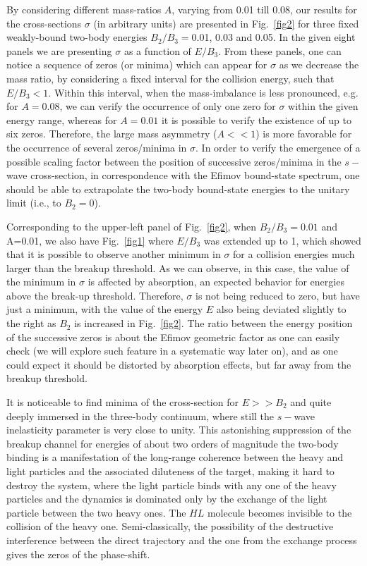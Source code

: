 \documentclass[twocolumn,amsmath,amssymb,epsfig,aps,prl]{revtex4}
\begin{document}
By considering different mass-ratios $A$, varying from 0.01 till 0.08, our
results for the cross-sections $\sigma$ (in arbitrary units)  are presented in Fig.~\ref{fig2} for 
three fixed weakly-bound two-body energies $B_2/{ B}_3=$0.01, 0.03 and 0.05. In the given  
eight panels we are presenting $\sigma$ as a function of $E/{ B}_3$.
From these panels, one can notice a sequence of zeros (or minima) which can appear for $\sigma$ 
as we decrease the mass ratio, by considering a fixed interval for the collision energy, such that
$E/{B}_3<1$.
Within this interval, when the mass-imbalance is less pronounced, e.g. for $A=0.08$, we can verify the 
occurrence of only one zero for $\sigma$ within the given energy range, whereas for  
$A=0.01$ it is possible to verify the existence of up to six zeros. 
Therefore, the large mass asymmetry ($A<<1$) is more favorable 
for the occurrence of several zeros/minima in $\sigma$. In order to verify the emergence
of a possible scaling factor between the position of successive zeros/minima in the $s-$wave cross-section, 
in correspondence with the Efimov bound-state spectrum, one should be able to extrapolate the 
two-body bound-state energies to the unitary limit (i.e., to $B_2=0$). 

Corresponding to the upper-left panel of Fig.~\ref{fig2}, when  $B_2/{ B}_3=0.01$ and
 A=0.01, we also have  Fig.~\ref{fig1} where $E/B_3$ was extended up to 1, which 
showed that it is possible to observe another minimum in $\sigma$ for a collision 
 energies much larger than the breakup threshold.  
 As we can observe, in this case, the value of the minimum in $\sigma$ is affected by 
 absorption, an expected behavior for energies above the break-up threshold. Therefore, $\sigma$ 
 is not being reduced to zero, but have just a minimum, with the value of the energy $E$
 also being deviated slightly to the right as $B_2$ is increased in Fig.~\ref{fig2}.
The ratio between the energy position of the successive zeros is about the Efimov geometric factor 
as one can easily check (we will explore such feature in a systematic  way later on), and as one could 
expect it should be  distorted by absorption effects, but far away from the breakup threshold. 

 It is noticeable to find minima of the cross-section for $E>>B_2$ and 
 quite deeply immersed in the three-body continuum, where still the
$s-$wave inelasticity parameter is very close to unity. This astonishing suppression of the breakup channel 
for energies of about two orders of magnitude the two-body binding is a manifestation of the 
long-range coherence between the heavy and light particles and the associated diluteness of the 
target, making it hard to destroy the system, where the light particle binds with any one of the 
heavy particles and the dynamics is dominated only by the exchange of the light particle between the 
two heavy ones. The $HL$ molecule becomes invisible to the collision of the heavy one. 
Semi-classically, the possibility of the destructive interference between the direct trajectory 
and the one from the exchange process gives the zeros of the phase-shift. 
\end{document}
